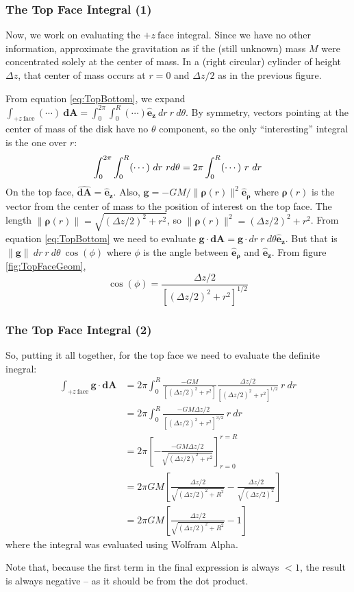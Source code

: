 \documentclass[aspectratio=43,serif,9pt]{beamer}
\newcommand{\vect}[1]{\boldsymbol{#1}}
\begin{document}
\begin{frame}
  \frametitle{The Top Face Integral (1)}
   Now, we work on evaluating the $+z~\mathrm{face}$ integral. Since we have no other information, approximate the
   gravitation as if the (still unknown) mass $M$ were concentrated solely at the center of mass. In a (right circular)
   cylinder of height $\Delta z$, that center of mass occurs at $r=0$ and $\Delta z/2$ as in the previous figure.

   From equation \eqref{eq:TopBottom}, we expand $\int_{+z~\mathrm{face}} (\cdots)\ \vect{dA} = \int_0^{2\pi} \int_0^R (\cdots) \vect{\hat{e}_z}\ dr\ r\ d\theta$. By symmetry, vectors pointing at the center of mass of the disk have no $\theta$ component, so the only ``interesting'' integral is the one over $r$:
   \[
     \int_0^{2\pi}  \int_0^R (\cdots)\ dr\ r\/d\theta = 2\pi \int_0^R (\cdots)\ r\ dr
   \]
   On the top face, $\vect{\widehat{dA}} = \vect{\hat{e}_z}$. Also, $\vect{g} = -GM/\|\vect{\rho}(r)\|^2 \vect{\hat{e}_\rho}$ where $\vect{\rho}(r)$ is the vector from the center of mass to the position of interest on the top face. The length $\|\vect{\rho}(r)\| = \sqrt{(\Delta z/2)^2 + r^2}$, so $\|\vect{\rho}(r)\|^2 = (\Delta z/2)^2 + r^2$.
   From equation \eqref{eq:TopBottom} we need to evaluate $\vect{g} \cdot \vect{dA} = \vect{g} \cdot dr\ r\ d\theta \vect{\hat{e}_z}$. But that is $\|\vect{g}\|\ dr\ r\ d\theta\  \cos(\phi)$ where $\phi$ is the angle between $\vect{\hat{e}_\rho}$ and $\vect{\hat{e}_z}$. From figure \ref{fig:TopFaceGeom},
   \[ \cos(\phi) = \frac{\Delta z/2}{\left [  (\Delta z/2)^2 + r^2 \right ]^{1/2}}
   \]

 \end{frame}

 \begin{frame}
   \frametitle{The Top Face Integral (2)}
   So, putting it all together, for the top face we need to evaluate the definite inegral:
   \begin{align}
     \int_{+z~\mathrm{face}} \vect{g} \cdot \vect{dA} &= 2\pi \int_0^R \frac{-G M}{\left[(\Delta z/2)^2 + r^2\right]} \frac{\Delta z/2}{\left [  (\Delta z/2)^2 + r^2 \right ]^{1/2}} \ r\ dr \nonumber\\
     \ &=2\pi \int_0^R \frac{-G M \Delta z/2}{\left [  (\Delta z/2)^2 + r^2 \right ]^{3/2}} \ r\ dr\nonumber\\
     \ &=2\pi \left[ -\frac{-G M \Delta z/2}{\sqrt{(\Delta z/2)^2 + r^2}} \right]_{r=0}^{r=R}\nonumber\\
     \ &=2\pi G M \left[ \frac{\Delta z/2}{\sqrt{(\Delta z/2)^2 + R^2}} - \frac{\Delta z/2}{\sqrt{(\Delta z/2)^2}}\right]\nonumber\\
     \ &=2\pi G M \left[ \frac{\Delta z/2}{\sqrt{(\Delta z/2)^2 + R^2}} - 1\right]
         \label{eq:TopFaceIntegral}
   \end{align}
   where the integral was evaluated using Wolfram Alpha.

   Note that, because the first term in the final expression is always $< 1$, the result is always negative -- as it should be from the dot product.

 \end{frame}
\end{document}
